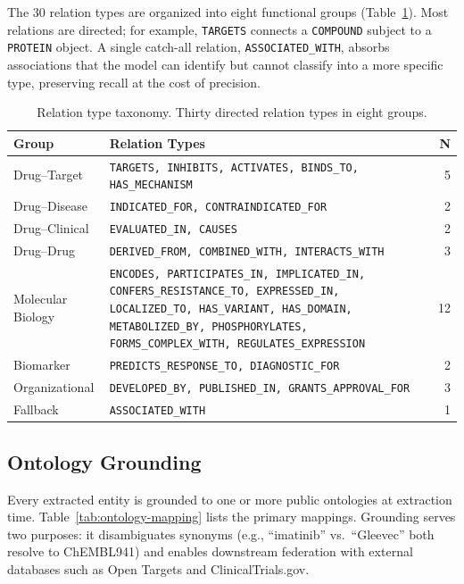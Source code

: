 The 30 relation types are organized into eight functional groups (Table~\ref{tab:relation-types}).
Most relations are directed; for example, \texttt{TARGETS} connects a \texttt{COMPOUND} subject to a \texttt{PROTEIN} object.
A single catch-all relation, \texttt{ASSOCIATED\_WITH}, absorbs associations that the model can identify but cannot classify into a more specific type, preserving recall at the cost of precision.

\begin{table}[t]
\centering
\small
\caption{Relation type taxonomy. Thirty directed relation types in eight groups.}
\label{tab:relation-types}
\begin{tabular}{@{}lp{5.5cm}r@{}}
\toprule
\textbf{Group} & \textbf{Relation Types} & \textbf{N} \\
\midrule
Drug--Target & \texttt{TARGETS, INHIBITS, ACTIVATES, BINDS\_TO, HAS\_MECHANISM} & 5 \\
Drug--Disease & \texttt{INDICATED\_FOR, CONTRAINDICATED\_FOR} & 2 \\
Drug--Clinical & \texttt{EVALUATED\_IN, CAUSES} & 2 \\
Drug--Drug & \texttt{DERIVED\_FROM, COMBINED\_WITH, INTERACTS\_WITH} & 3 \\
Molecular Biology & \texttt{ENCODES, PARTICIPATES\_IN, IMPLICATED\_IN, CONFERS\_RESISTANCE\_TO, EXPRESSED\_IN, LOCALIZED\_TO, HAS\_VARIANT, HAS\_DOMAIN, METABOLIZED\_BY, PHOSPHORYLATES, FORMS\_COMPLEX\_WITH, REGULATES\_EXPRESSION} & 12 \\
Biomarker & \texttt{PREDICTS\_RESPONSE\_TO, DIAGNOSTIC\_FOR} & 2 \\
Organizational & \texttt{DEVELOPED\_BY, PUBLISHED\_IN, GRANTS\_APPROVAL\_FOR} & 3 \\
Fallback & \texttt{ASSOCIATED\_WITH} & 1 \\
\bottomrule
\end{tabular}
\end{table}

\subsection{Ontology Grounding}
\label{sec:ontology-grounding}

Every extracted entity is grounded to one or more public ontologies at extraction time.
Table~\ref{tab:ontology-mapping} lists the primary mappings.
Grounding serves two purposes: it disambiguates synonyms (e.g., ``imatinib'' vs.\ ``Gleevec'' both resolve to ChEMBL941) and enables downstream federation with external databases such as Open Targets and ClinicalTrials.gov.

